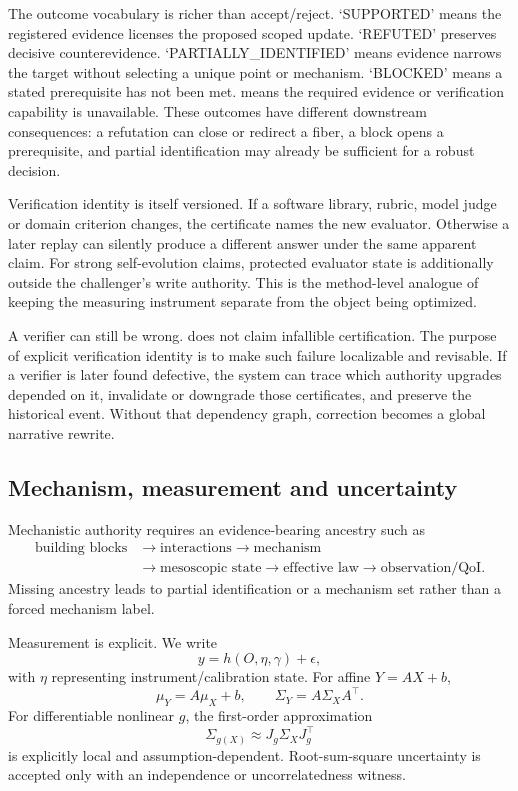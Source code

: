 The outcome vocabulary is richer than accept/reject. `SUPPORTED' means the registered evidence licenses the proposed scoped update. `REFUTED' preserves decisive counterevidence. `PARTIALLY\_IDENTIFIED' means evidence narrows the target without selecting a unique point or mechanism. `BLOCKED' means a stated prerequisite has not been met. \CannotCheck{} means the required evidence or verification capability is unavailable. These outcomes have different downstream consequences: a refutation can close or redirect a fiber, a block opens a prerequisite, and partial identification may already be sufficient for a robust decision.

Verification identity is itself versioned. If a software library, rubric, model judge or domain criterion changes, the certificate names the new evaluator. Otherwise a later replay can silently produce a different answer under the same apparent claim. For strong self-evolution claims, protected evaluator state is additionally outside the challenger's write authority. This is the method-level analogue of keeping the measuring instrument separate from the object being optimized.

A verifier can still be wrong. \RAKL{} does not claim infallible certification. The purpose of explicit verification identity is to make such failure localizable and revisable. If a verifier is later found defective, the system can trace which authority upgrades depended on it, invalidate or downgrade those certificates, and preserve the historical event. Without that dependency graph, correction becomes a global narrative rewrite.

\subsection{Mechanism, measurement and uncertainty}
Mechanistic authority requires an evidence-bearing ancestry such as
\begin{equation}
\begin{aligned}
\text{building blocks}&\to\text{interactions}\to\text{mechanism}\\
&\to\text{mesoscopic state}\to\text{effective law}\to\text{observation/QoI}.
\end{aligned}
\end{equation}
Missing ancestry leads to partial identification or a mechanism set rather than a forced mechanism label.

Measurement is explicit. We write
\begin{equation}y=h(O,\eta,\gamma)+\epsilon,\end{equation}
with $\eta$ representing instrument/calibration state. For affine $Y=AX+b$,
\begin{equation}\mu_Y=A\mu_X+b,\qquad \Sigma_Y=A\Sigma_XA^\top.\end{equation}
For differentiable nonlinear $g$, the first-order approximation
\begin{equation}\Sigma_{g(X)}\approx J_g\Sigma_XJ_g^\top\end{equation}
is explicitly local and assumption-dependent. Root-sum-square uncertainty is accepted only with an independence or uncorrelatedness witness.

